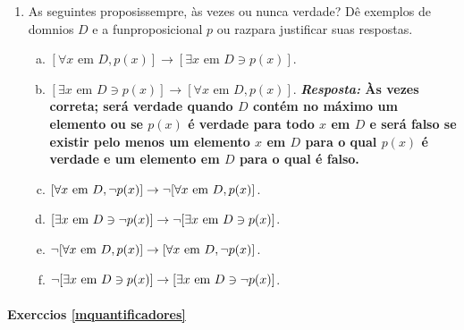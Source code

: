 \begin{enumerate}[{\bf 1.}]
\item As seguintes proposi\coes s\ao sempre, \`as vezes ou nunca verdade? D\^e exemplos de dom\ih nios $D$ e a fun\cao proposicional $p$ ou raz\oes para justificar suas respostas. 
\begin{enumerate}[a)]
\item $[\forall x \textrm{ em } D, p(x)]\to[\exists x \textrm{ em } D \ni p(x)]$.
\item $[\exists x \textrm{ em } D \ni p(x)]\to[\forall x \textrm{ em } D, p(x)]$. {\bf{\it Resposta:} \`As vezes correta; ser\'a verdade quando $D$ cont\'em no m\'aximo um elemento ou se $p(x)$ \'e verdade para todo $x$ em $D$ e ser\'a falso se existir pelo menos um elemento $x$ em $D$ para o qual $p(x)$ \'e verdade e um elemento em $D$ para o qual \'e falso. }
\item $[\forall x \textrm{ em } D, \lnot p(x)]\to\lnot[\forall x \textrm{ em } D, p(x)]$.
\item $[\exists x \textrm{ em } D \ni \lnot p(x)]\to \lnot[\exists x \textrm{ em } D \ni p(x)]$.
\item $\lnot[\forall x \textrm{ em } D, p(x)]\to[\forall x \textrm{ em } D, \lnot p(x)]$.
\item $\lnot[\exists x \textrm{ em } D \ni p(x)]\to[\exists x \textrm{ em } D \ni \lnot p(x)]$.
\end{enumerate}
\end{enumerate}
\paragraph{Exerc\ih cios \ref{mquantificadores}}

